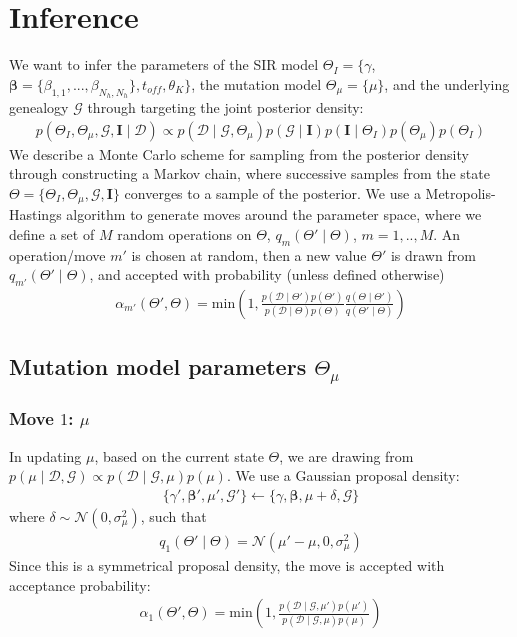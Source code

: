 \documentclass[a4paper,18pt]{report}
\begin{document}
\section{Inference}
We want to infer the parameters of the SIR model $\Theta_{I} = \{\gamma$, $\boldsymbol{\beta}= \{\beta_{1,1},...,\beta_{N_h,N_h}\}, t_{off}, \theta_K\}$, the mutation model $\Theta_{\mu} = \{\mu\}$, and the underlying genealogy $\mathcal{G}$ through targeting the joint posterior density:
\begin{eqnarray}
p(\Theta_{I}, \Theta_{\mu}, \mathcal{G}, \mathbf{I} \mid \mathcal{D})\propto p(\mathcal{D}\mid \mathcal{G}, \Theta_{\mu})p(\mathcal{G}\mid \mathbf{I}) p(\mathbf{I} \mid \Theta_{I}) p(\Theta_{\mu}) p(\Theta_{I})
\end{eqnarray}
We describe a Monte Carlo scheme for sampling from the posterior density through constructing a Markov chain, where successive samples from the state $\Theta=\{\Theta_{I}, \Theta_{\mu}, \mathcal{G}, \mathbf{I} \}$ converges to a sample of the posterior. We use a Metropolis-Hastings algorithm to generate moves around the parameter space, where we define a set of $M$ random operations on $\Theta$, $q_m(\Theta'\mid \Theta)$, $m=1,..,M$. An operation/move $m'$ is chosen at random, then a new value $\Theta'$ is drawn from  $q_{m'}(\Theta'\mid \Theta)$, and accepted with probability (unless defined otherwise) 
\begin{eqnarray}
\alpha_{m'}(\Theta',\Theta)=\textrm{min}\left(1,\frac{p(\mathcal{D}\mid \Theta')p(\Theta')}{p(\mathcal{D}\mid \Theta)p(\Theta)} \frac{q(\Theta\mid\Theta')}{q(\Theta'\mid\Theta)}\right)
\end{eqnarray}
\subsection{Mutation model parameters $\Theta_{\mu}$} 
\subsubsection{Move $1$: $\mu$}
In updating $\mu$, based on the current state $\Theta$, we are drawing from $p(\mu\mid\mathcal{D},\mathcal{G}) \propto p(\mathcal{D}\mid \mathcal{G}, \mu)p(\mu)$. We use a Gaussian proposal density:
\begin{eqnarray}
\{\gamma', \boldsymbol{\beta}', \mu', \mathcal{G}'\}\leftarrow\{\gamma, \boldsymbol{\beta}, \mu+\delta, \mathcal{G}\}
\end{eqnarray}
where $\delta\sim\mathcal{N}(0,\sigma_{\mu}^2)$, such that 
\begin{eqnarray}
q_1(\Theta'\mid\Theta) = \mathcal{N}(\mu'-\mu,0,\sigma_{\mu}^2)
\end{eqnarray}
Since this is a symmetrical proposal density, the move is accepted with acceptance probability:
\begin{eqnarray}
\alpha_{1}(\Theta',\Theta)=\textrm{min}\left(1,\frac{p(\mathcal{D}\mid \mathcal{G}, \mu')p(\mu')}{p(\mathcal{D}\mid \mathcal{G}, \mu )p(\mu)} \right)
\end{eqnarray}
\end{document}
